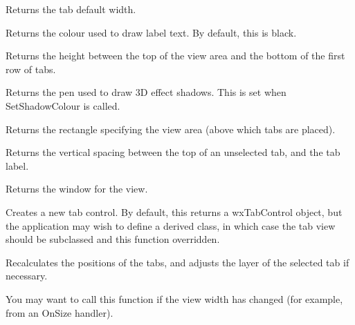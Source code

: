 Returns the tab default width.



Returns the colour used to draw label text. By default, this is
black.



Returns the height between the top of the view area and the bottom of the first
row of tabs.



Returns the pen used to draw 3D effect shadows. This is set when
SetShadowColour is called. 



Returns the rectangle specifying the view area (above which tabs are
placed).



Returns the vertical spacing between the top of an unselected tab, and the tab label.



Returns the window for the view.



Creates a new tab control. By default, this returns a wxTabControl object, but the application may wish
to define a derived class, in which case the tab view should be subclassed and this function overridden.



Recalculates the positions of the tabs, and adjusts the layer of the selected tab if necessary.

You may want to call this function if the view width has changed (for example, from an OnSize handler).


